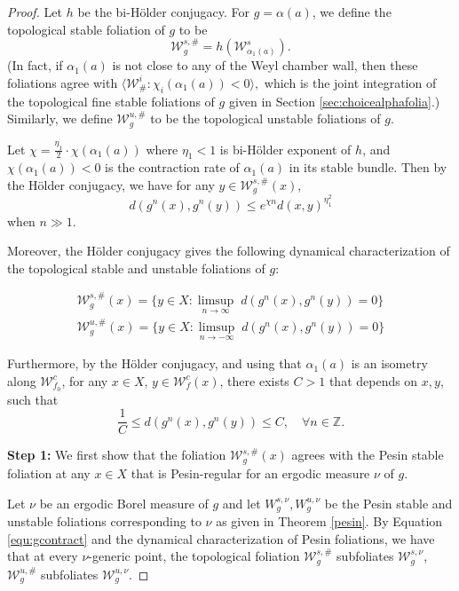 \documentclass[11pt]{amsart}
\numberwithin{equation}{section}
\newcommand{\Z}{\mathbb{Z}}
\newcommand{\W}{\mathcal{W}}
\theoremstyle{plain}
\begin{document}
\begin{proof}


 Let $h$ be the bi-H\"older conjugacy. For $g=\alpha(a)$, we define the topological stable foliation of $g$ to be 
 $$\W^{s,\#}_g=h(\W^s_{\alpha_1(a)}).$$ (In fact, if $\alpha_1(a)$ is not close to any of the Weyl chamber wall, then these foliations agree with $\langle \W^i_\# : \chi_i(\alpha_1(a))<0 \rangle,$
 which is the joint integration of the topological fine stable foliations of $g$ given in Section \ref{sec:choicealphafolia}.) Similarly, we define $\W^{u,\#}_g$ to be the topological unstable foliations of $g$.

 Let $\chi=\frac{\eta_1}{2} \cdot \chi(\alpha_1(a))$ where $\eta_1<1$ is bi-H\"older exponent of $h$, and $\chi(\alpha_1(a))<0$ is the contraction rate of $\alpha_1(a)$ in its stable bundle. Then by the H\"older conjugacy, we have for any $y\in \W^{s,\#}_g(x)$, \begin{equation}\label{equ:gcontract}
 d(g^n(x),g^n(y))\le e^{\chi n} d(x,y)^{\eta_1^2} 
 \end{equation} when $n\gg1$.

 Moreover, the H\"older conjugacy gives the following dynamical characterization of the topological stable and unstable foliations of $g$: 
 
 \begin{equation}\label{equ:dyncha}
 \begin{split}
 \W^{s,\#}_g(x)=\{y\in X: \limsup_{n\to \infty } \;d(g^n(x),g^n(y))=0\}\\
 \W^{u,\#}_g(x)=\{y\in X: \limsup_{n\to -\infty }\;d(g^n(x),g^n(y))=0\}
 \end{split}
 \end{equation}

 Furthermore, by the H\"older conjugacy, and using that $\alpha_1(a)$ is an isometry along $\W^c_{f_0}$, for any $x\in X,\,y\in \W^c_f(x)$, there exists $C>1$ that depends on $x,y$, such that \begin{equation}\label{equ:cendyn}
     \frac{1}{C}\le d(g^n(x),g^n(y))\le C,\quad  \forall n\in \Z.
 \end{equation}
 \color{black}

\textbf{Step 1:} We first show that the foliation $\W^{s,\#}_g(x)$ agrees with the Pesin stable foliation at any $x\in X$ that is Pesin-regular for an ergodic measure $\nu$ of $g$. 

Let $\nu$ be an ergodic Borel measure of $g$ and let $W^{s,\nu}_g, W^{u,\nu}_g$ be the Pesin stable and unstable foliations corresponding to $\nu$ as given in Theorem \ref{pesin}. By Equation \ref{equ:gcontract} and the dynamical characterization of Pesin foliations, we have that at every $\nu$-generic point, the topological foliation $\W^{s,\#}_g$ subfoliates $\W^{s,\nu}_g$, $\W^{u,\#}_g$ subfoliates $\W^{u,\nu}_g$. 


\end{proof}
\end{document}
